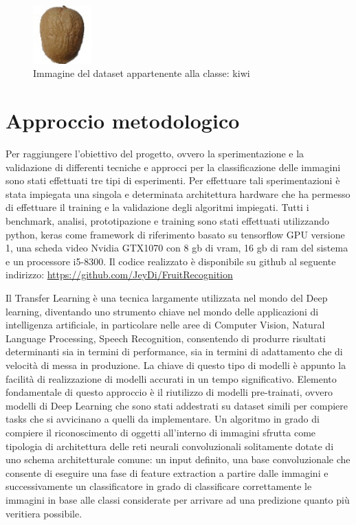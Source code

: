 \begin{figure}[H]
    \centering
    \includegraphics[width=0.2\textwidth]{./resources/kiwi.jpg}
    \caption{Immagine del dataset appartenente alla classe: kiwi} 
    \label{fig:kiwi}
\end{figure}

\section{Approccio metodologico}

Per raggiungere l'obiettivo del progetto, ovvero la sperimentazione e la validazione di differenti tecniche e approcci per la classificazione delle immagini sono stati effettuati tre tipi di esperimenti.  
Per effettuare tali sperimentazioni è stata impiegata una singola e determinata architettura hardware che ha permesso di effettuare il training e la validazione degli algoritmi impiegati.  
Tutti i benchmark, analisi, prototipazione e training sono stati effettuati utilizzando python, keras come framework di riferimento basato su tensorflow GPU versione 1, una scheda video Nvidia GTX1070 con 8 gb di vram, 16 gb di ram del sistema e un processore i5-8300.  
Il codice realizzato è disponibile su github al seguente indirizzo:  \url{https://github.com/JeyDi/FruitRecognition} \bigskip

Il Transfer Learning è una tecnica largamente utilizzata nel mondo del Deep learning, diventando uno strumento chiave nel mondo delle applicazioni di intelligenza artificiale, in particolare nelle aree di Computer Vision, Natural Language Processing, Speech Recognition, consentendo di produrre risultati determinanti sia in termini di performance, sia in termini di adattamento che di velocità di messa in produzione.  
La chiave di questo tipo di modelli è appunto la facilità di realizzazione di modelli accurati in un tempo significativo.  
Elemento fondamentale di questo approccio è il riutilizzo di modelli pre-trainati, ovvero modelli di Deep Learning che sono stati addestrati su dataset simili per compiere tasks che si avvicinano a quelli da implementare.  
Un algoritmo in grado di compiere il riconoscimento di oggetti all'interno di immagini sfrutta come tipologia di architettura delle reti neurali convoluzionali solitamente dotate di uno schema architetturale comune: un input definito, una base convoluzionale che consente di eseguire una fase di feature extraction a partire dalle immagini e successivamente un classificatore in grado di classificare correttamente le immagini in base alle classi considerate per arrivare ad una predizione quanto più veritiera possibile. 

